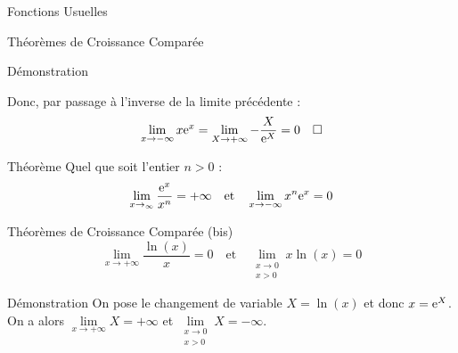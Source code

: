 \documentclass{cours}
\begin{document}
\begin{Gpartie}{Fonctions Usuelles}
\begin{Spartie}{Théorèmes de Croissance Comparée}
\begin{SSpartie}{Démonstration}
\begin{itemize}
                    Donc, par passage à l'inverse de la limite précédente : 
                    \[\lim\limits_{x\to-\infty}x\mathrm{e}^x=\lim\limits_{X\to+\infty}-\frac{X}{\mathrm{e}^X}=0\quad\square\]
                \end{itemize}
            \end{SSpartie}
        \end{Spartie}
        \begin{Spartie}{Théorème} 
            Quel que soit l'entier $n>0$ : \[\lim\limits_{x\to_\infty}\frac{\mathrm{e}^x}{x^n}=+\infty\quad\text{et}\quad\lim\limits_{x\to-\infty}x^n\mathrm{e}^x=0\]
        \end{Spartie}
        \begin{Spartie}{Théorèmes de Croissance Comparée (bis)} 
            \[\lim\limits_{x\to+\infty}\frac{\ln(x)}{x}=0\quad\text{et}\quad\lim\limits_{\substack{x\to0 \\ x>0}}x\ln(x)=0\]
            \begin{SSpartie}{Démonstration} 
                On pose le changement de variable $X=\ln(x)$ et donc $x=\mathrm{e}^X$. On a alors $\lim\limits_{x\to+\infty}X=+\infty$ et $\lim\limits_{\substack{x\to0 \\ x>0}}X=-\infty$.
            \end{SSpartie}
        \end{Spartie}
    \end{Gpartie}
\end{document}
